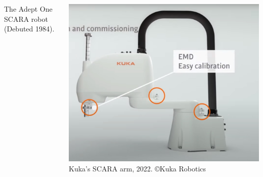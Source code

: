 \begin{frame}
\begin{columns}[t]
\begin{column}{5cm}
\begin{minipage}[b]{.5\textwidth}
				\footnotesize The Adept One SCARA robot (Debuted 1984). 
			\end{minipage}
		\end{column}
		\begin{column}{5cm}
			\begin{minipage}[b]{.5\textwidth}
				\includegraphics[width=1.5\textwidth, height=1.5\textwidth]{figures/Scara.jpg} \\
				\footnotesize{Kuka's SCARA arm, 2022. \copyright Kuka Robotics} %
		\end{minipage}
	\end{column}
\end{columns}
\end{frame}


